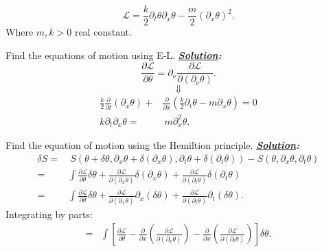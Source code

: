 \documentclass[notitlepage]{report}
\begin{document}
\begin{question}[title = Question 2]{}{}
\[
	\mathcal{L}=\frac{k}{2}\partial_t\theta\partial_x\theta-\frac{m}{2}\left(\partial_x\theta\right)^2 
.\] 
Where $m,k>0$ real constant.
	\begin{question}[title = Part 1]{}{}
Find the equations of motion using E-L.
\tcblower
\textbf{\emph{\underline{Solution}:}}\\
\[
\frac{\partial\mathcal{L}}{\partial\theta}=\partial_\nu \frac{\partial\mathcal{L}}{\partial \left(\partial_\nu\theta\right) }
.\] 
\[
	\Downarrow
\] 
\begin{align*}
	\frac{k}{2}\frac{\partial}{\partial t}\left(\partial_x\theta\right)+&\frac{\partial}{\partial x}\left(\frac{k}{2}\partial_t\theta-m\partial_x\theta\right) = 0\\
 k\partial_t\partial_x\theta =&\ m\partial^2_x\theta
.\end{align*}
\end{question}
\begin{question}[title = Part 2]{}{}
	Find the equation of motion using the Hemiltion principle.
\tcblower
\textbf{\emph{\underline{Solution}:}}\\
\begin{align*}
	\delta S =&\ S\left(\theta+\delta\theta,\partial_x\theta+\delta\left(\partial_x\theta\right),\partial_t\theta+\delta\left(\partial_t\theta\right) \right) -S\left(\theta,\partial_x\theta,\partial_t\theta \right)\\
	=&\int\frac{\partial\mathcal{L}}{\partial\theta}\delta\theta+\frac{\partial\mathcal{L}}{\partial\left(\partial_x\theta\right) }\delta\left(\partial_x\theta\right)+\frac{\partial\mathcal{L}}{\partial\left(\partial_t\theta\right)}\delta\left(\partial_t\theta\right)\\
	=&\int\frac{\partial\mathcal{L}}{\partial\theta}\delta\theta+\frac{\partial\mathcal{L}}{\partial\left(\partial_x\theta\right) }\partial_x\left(\delta\theta\right)+\frac{\partial\mathcal{L}}{\partial\left(\partial_t\theta\right)}\partial_t\left(\delta\theta\right)
.\end{align*}
Integrating by parts:\\
\begin{align*}
	=&\int\left[\frac{\partial\mathcal{L}}{\partial\theta}-\frac{\partial}{\partial x} \left(\frac{\partial\mathcal{L}}{\partial\left(\partial_x\theta\right) }\right) -\frac{\partial}{\partial x}\left(\frac{\partial\mathcal{L}}{\partial\left(\partial_t\theta\right)}\right) \right] \delta\theta
.\end{align*}

\end{question}
\end{question}
\end{document}
